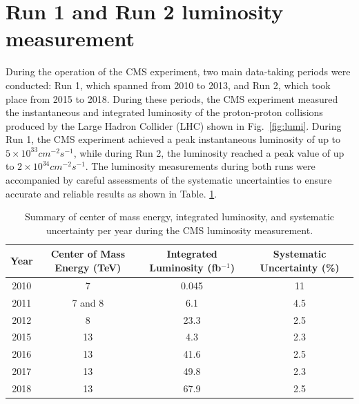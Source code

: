 \section{Run 1 and Run 2 luminosity measurement}

During the operation of the CMS experiment, two main data-taking periods were conducted: Run 1, which spanned from 2010 to 2013, and Run 2, which took place from 2015 to 2018. During these periods, the CMS experiment measured the instantaneous and integrated luminosity of the proton-proton collisions produced by the Large Hadron Collider (LHC) shown in Fig.~\ref{fig:lumi}. During Run 1, the CMS experiment achieved a peak instantaneous luminosity of up to $5 \times 10^{33} cm^{-2} s^{-1}$, while during Run 2, the luminosity reached a peak value of up to $2 \times 10^{34} cm^{-2} s^{-1}$. The luminosity measurements during both runs were accompanied by careful assessments of the systematic uncertainties to ensure accurate and reliable results as shown in Table. \ref{tab:lumi}.


\begin{table}[h]
\centering
\caption{Summary of center of mass energy, integrated luminosity, and systematic uncertainty per year during the CMS luminosity measurement.}
\begin{tabular}{c c c c}
Year & Center of Mass Energy (TeV) & Integrated Luminosity (fb$^{-1}$) & Systematic Uncertainty (\%) \\
\hline
2010 & 7 & 0.045 & 11 \\
2011 & 7 and 8 & 6.1 & 4.5 \\
2012 & 8 & 23.3 & 2.5 \\
2015 & 13 & 4.3 & 2.3 \\
2016 & 13 & 41.6 & 2.5 \\
2017 & 13 & 49.8 & 2.3 \\
2018 & 13 & 67.9 &  2.5\\
\end{tabular}
\label{tab:lumi}
\end{table}


